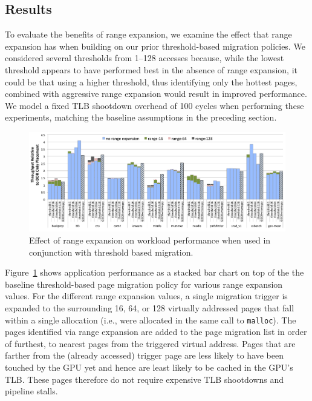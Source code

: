 \subsection{Results}
\label{rangeexpansionresults}
To evaluate the benefits of range expansion, we examine the effect that range expansion has when
building on our prior threshold-based migration policies.  We considered several thresholds from 1--128 accesses because, while 
the lowest threshold appears to have performed best in the absence of range expansion, it could be that using a higher
threshold, thus identifying only the hottest pages, combined with aggressive range expansion would result in improved performance. 
We model a fixed TLB shootdown overhead of 100 cycles  when performing these experiments, matching the baseline assumptions in the preceding section.

\begin{figure}[t]
    \includegraphics[width=\textwidth]{hpca2015/figures/thresh-rangeExp.png} 
    \caption{Effect of range expansion on workload performance when used in conjunction with threshold based migration.}
    \label{fig:rangeexpansion}
\end{figure}

Figure~\ref{fig:rangeexpansion} shows application performance as a stacked bar chart on top of the
the baseline threshold-based page migration policy for various range expansion values.
For the different range expansion values, a single migration trigger is expanded to the surrounding 16, 64, or 128 
virtually addressed pages that fall within a single allocation (i.e., were
allocated in the same call to {\tt malloc}).
The pages identified via range expansion are added to the page migration list in order of furthest, 
to nearest pages from the triggered virtual address. Pages that are farther from the (already accessed) trigger
page are less likely to have been touched by the GPU yet and hence are
least likely to be cached in the GPU's TLB. These pages therefore do not
require expensive TLB shootdowns and pipeline stalls.

